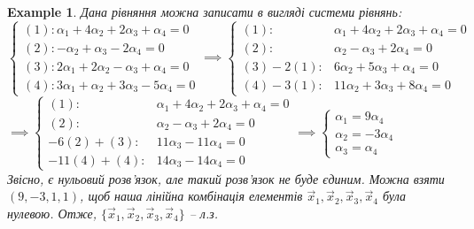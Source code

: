 \documentclass[a4paper, 10pt]{article}
\theoremstyle{theoremdd}
\newtheorem{example}[theorem]{Example}
\begin{document}
\begin{example}
	Дана рівняння можна записати в вигляді системи рівнянь:\\
	$\begin{cases}
	(1): \alpha_1 + 4\alpha_2 + 2\alpha_3 + \alpha_4 = 0\\
	(2): -\alpha_2 + \alpha_3 - 2\alpha_4 = 0\\
	(3): 2\alpha_1 + 2\alpha_2 - \alpha_3 + \alpha_4 = 0\\
	(4): 3\alpha_1 + \alpha_2 + 3\alpha_3 - 5\alpha_4 = 0
	\end{cases} \implies \begin{cases}
	(1): & \alpha_1 + 4\alpha_2 + 2\alpha_3 + \alpha_4 = 0\\
	(2): & \alpha_2 - \alpha_3 + 2\alpha_4 = 0\\
	(3)-2(1): & 6\alpha_2 + 5\alpha_3 + \alpha_4 = 0\\
	(4)-3(1): & 11\alpha_2 + 3\alpha_3 + 8\alpha_4 = 0
	\end{cases}$\\
	
	$\implies \begin{cases}
	(1): & \alpha_1 + 4\alpha_2 + 2\alpha_3 + \alpha_4 = 0\\
	(2): & \alpha_2 - \alpha_3 + 2\alpha_4 = 0\\
	-6(2)+(3): & 11\alpha_3 - 11\alpha_4 = 0\\
	-11(4)+(4): & 14\alpha_3 - 14\alpha_4 = 0
	\end{cases} 
	\implies
	\begin{cases}
	\alpha_1 = 9\alpha_4\\
	\alpha_2 = -3\alpha_4\\
	\alpha_3 = \alpha_4
	\end{cases} 
	$\\
	Звісно, є нульовий розв'язок, але такий розв'язок не буде єдиним. Можна взяти $(9,-3,1,1)$, щоб наша лінійна комбінація елементів $\vec{x}_1,\vec{x}_2,\vec{x}_3,\vec{x}_4$ була нулевою. Отже, $\{\vec{x}_1,\vec{x}_2,\vec{x}_3,\vec{x}_4\}$ -- л.з.
	\end{example}
	
\end{document}
